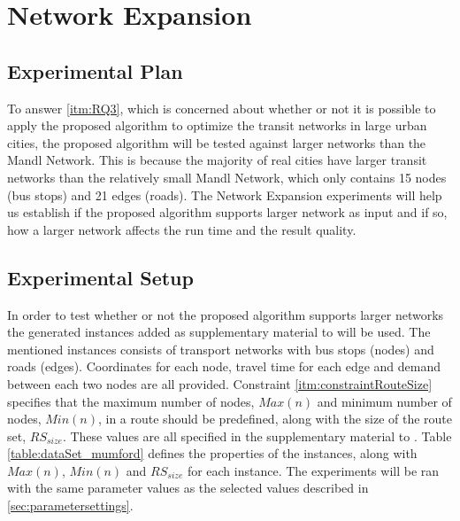 \section{Network Expansion}

\subsection{Experimental Plan}
To answer \vref{itm:RQ3}, which is concerned about whether or not it is possible to apply the proposed algorithm to optimize the transit networks in large urban cities, the proposed algorithm will be tested against larger networks than the Mandl Network. This is because the majority of real cities have larger transit networks than the relatively small Mandl Network, which only contains 15 nodes (bus stops) and 21 edges (roads). The Network Expansion experiments will help us establish if the proposed algorithm supports larger network as input and if so, how a larger network affects the run time and the result quality.


\subsection{Experimental Setup}
\label{subsec:scalabilityExperiments_setup}

In order to test whether or not the proposed algorithm supports larger networks the generated instances added as supplementary material to \citet{mumford13} will be used. The mentioned instances consists of transport networks with bus stops (nodes) and roads (edges). Coordinates for each node, travel time for each edge and demand between each two nodes are all provided. Constraint \vref{itm:constraintRouteSize} specifies that the maximum number of nodes, $Max(n)$ and minimum number of nodes, $Min(n)$, in a route should be predefined, along with the size of the route set, $RS_{size}$. These values are all specified in the supplementary material to \citet{mumford13}. Table \vref{table:dataSet_mumford} defines the properties of the instances, along with $Max(n)$, $Min(n)$ and $RS_{size}$ for each instance. The experiments will be ran with the same parameter values as the selected values described in \vref{sec:parametersettings}.

